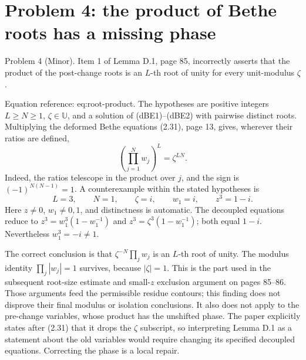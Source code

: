 \documentclass[10pt]{article}
\begin{document}
\section*{Problem 4: the product of Bethe roots has a missing phase}
Problem 4 (Minor).  Item 1 of Lemma D.1, page 85, incorrectly asserts that the product of the post-change roots is an \(L\)-th root of unity for every unit-modulus \(\zeta\).\par
Equation reference: eq:root-product. The hypotheses are positive integers \(L\geq N\geq1\), \(\zeta\in\mathbb U\), and a solution of (dBE1)–(dBE2) with pairwise distinct roots. Multiplying the deformed Bethe equations (2.31), page 13, gives, wherever their ratios are defined, \[
 \left(\prod_{j=1}^N w_j\right)^L=\zeta^{LN}.\] Indeed, the ratios telescope in the product over \(j\), and the sign is \((-1)^{N(N-1)}=1\). A counterexample within the stated hypotheses is \[L=3,\qquad N=1,\qquad \zeta=i,\qquad w_1=i,\qquad z^3=1-i.\] Here \(z\ne0\), \(w_1\ne0,1\), and distinctness is automatic. The decoupled equations reduce to \(z^3=w_1^3(1-w_1^{-1})\) and \(z^3=\zeta^3(1-w_1^{-1})\); both equal \(1-i\). Nevertheless \(w_1^3=-i\ne1\).\par
The correct conclusion is that \(\zeta^{-N}\prod_jw_j\) is an \(L\)-th root of unity. The modulus identity \(\prod_j|w_j|=1\) survives, because \(|\zeta|=1\). This is the part used in the subsequent root-size estimate and small-\(z\) exclusion argument on pages 85–86. Those arguments feed the permissible residue contours; this finding does not disprove their final modulus or isolation conclusions. It also does not apply to the pre-change variables, whose product has the unshifted phase. The paper explicitly states after (2.31) that it drops the \(\zeta\) subscript, so interpreting Lemma D.1 as a statement about the old variables would require changing its specified decoupled equations. Correcting the phase is a local repair.\par
\end{document}
